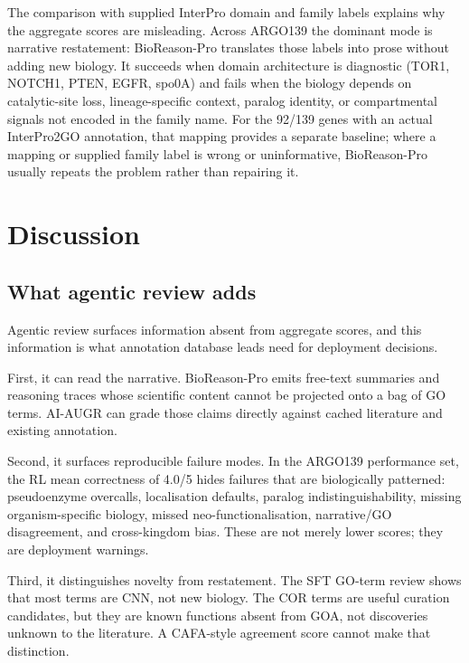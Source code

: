 \documentclass[
  11pt,
]{article}
\begin{document}
The comparison with supplied InterPro domain and family labels explains
why the aggregate scores are misleading. Across ARGO139 the dominant
mode is narrative restatement: BioReason-Pro translates those labels into
prose without adding new biology. It succeeds when domain architecture is
diagnostic (TOR1, NOTCH1, PTEN, EGFR, spo0A) and fails when the biology
depends on catalytic-site loss, lineage-specific context, paralog
identity, or compartmental signals not encoded in the family name. For
the 92/139 genes with an actual InterPro2GO annotation, that mapping
provides a separate baseline; where a mapping or supplied family label is
wrong or uninformative, BioReason-Pro usually repeats the problem rather
than repairing it.

\hypertarget{discussion}{%
\section{Discussion}\label{discussion}}

\hypertarget{what-agentic-review-adds}{%
\subsection{What agentic review
adds}\label{what-agentic-review-adds}}

Agentic review surfaces information absent from aggregate scores, and
this information is what annotation database leads need for deployment
decisions.

First, it can read the narrative. BioReason-Pro emits free-text
summaries and reasoning traces whose scientific content cannot be
projected onto a bag of GO terms. AI-AUGR can grade those claims directly
against cached literature and existing annotation.

Second, it surfaces reproducible failure modes. In the ARGO139 performance
set, the RL mean correctness of 4.0/5 hides failures that are biologically patterned:
pseudoenzyme overcalls, localisation defaults, paralog
indistinguishability, missing organism-specific biology, missed
neo-functionalisation, narrative/GO disagreement, and cross-kingdom
bias. These are not merely lower scores; they are deployment warnings.

Third, it distinguishes novelty from restatement. The SFT GO-term review
shows that most terms are CNN, not new biology. The COR terms are useful
curation candidates, but they are known functions absent from GOA, not
discoveries unknown to the literature. A CAFA-style agreement score
cannot make that distinction.
\end{document}
